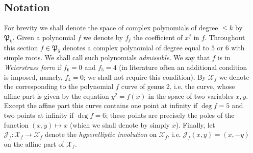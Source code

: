 \documentclass{amsart}
\numberwithin{equation}{section}
\theoremstyle{definition}
\theoremstyle{remark}
\begin{document}
	\subsection{Notation} For brevity we shall denote the space of complex polynomials of degree $\le k$ by $\mathfrak P_k$. Given a polynomial $f$ we denote by $f_j$ the coefficient of $x^j$ in $f$. Throughout this section $f \in \mathfrak P_6$ denotes a complex polynomial of degree equal to $5$ or $6$ with simple roots. We shall call such polynomials {\it{admissible}}. We say that $f$ is in {\it{Weierstrass form}} if $f_6 = 0$ and $f_5 = 4$ (in literature often an additional condition is imposed, namely, $f_4 = 0$; we shall not require this condition). By $\mathcal X_f$ we denote the corresponding to the polynomial $f$ curve of genus $2$, i.e. the curve, whose affine part is given by the equation $y^2 = f(x)$ in the space of two variables $x,y$. Except the affine part this curve contains one point at infinity if $\deg f = 5$ and two points at infinity if $\deg f = 6$; these points are precisely the poles of the function $(x,y) \mapsto x$ (which we shall denote by simply $x$). Finally, let $\mathscr J_f:\mathcal X_f \to \mathcal X_f$ denote the {\it{hyperelliptic involution}} on $\mathcal X_f$, i.e. $\mathscr J_f(x,y) = (x,-y)$ on the affine part of $\mathcal X_f$. 
	
\end{document}
